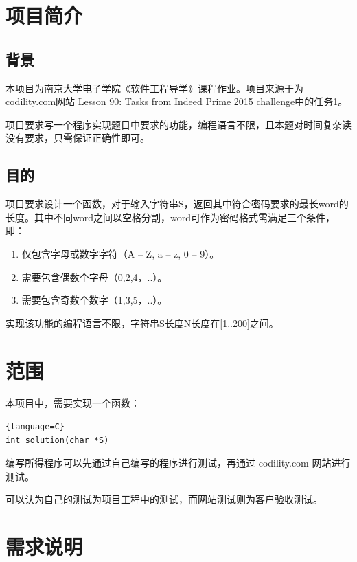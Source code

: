 




% 

\begin{spacing}{1.5}
\songti{}
    \section{项目简介}
    \subsection{背景}
    本项目为南京大学电子学院《软件工程导学》课程作业。项目来源于为codility.com网站 Lesson 90: Tasks from Indeed Prime 2015 challenge中的任务1。 

    项目要求写一个程序实现题目中要求的功能，编程语言不限，且本题对时间复杂读没有要求，只需保证正确性即可。

    \subsection{目的}
    项目要求设计一个函数，对于输入字符串S，返回其中符合密码要求的最长word的长度。其中不同word之间以空格分割，word可作为密码格式需满足三个条件，即：
    \begin{enumerate} [\indent (1)]
            \item 仅包含字母或数字字符（A -- Z, a -- z, 0 -- 9）。
            \item 需要包含偶数个字母（0,2,4，..）。
            \item 需要包含奇数个数字（1,3,5，..）。
    \end{enumerate}

    实现该功能的编程语言不限，字符串S长度N长度在[1..200]之间。
    
    \section{范围}
    本项目中，需要实现一个函数：
\begin{lstlisting}{language=C}
int solution(char *S)
\end{lstlisting}

    编写所得程序可以先通过自己编写的程序进行测试，再通过 codility.com 网站进行测试。

    可以认为自己的测试为项目工程中的测试，而网站测试则为客户验收测试。

    \section{需求说明}

\end{spacing}
